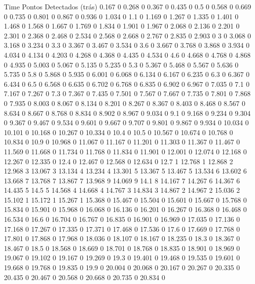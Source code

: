 Time	Pontos Detectados (trás)
0.167	0
0.268	0
0.367	0
0.435	0
0.5	0
0.568	0
0.669	0
0.735	0
0.801	0
0.867	0
0.936	0
1.034	0
1.1	0
1.169	0
1.267	0
1.335	0
1.401	0
1.468	0
1.568	0
1.667	0
1.769	0
1.834	0
1.901	0
1.967	0
2.068	0
2.136	0
2.201	0
2.301	0
2.368	0
2.468	0
2.534	0
2.568	0
2.668	0
2.767	0
2.835	0
2.903	0
3	0
3.068	0
3.168	0
3.234	0
3.3	0
3.367	0
3.467	0
3.534	0
3.6	0
3.667	0
3.768	0
3.868	0
3.934	0
4.034	0
4.134	0
4.203	0
4.268	0
4.368	0
4.435	0
4.534	0
4.6	0
4.668	0
4.768	0
4.868	0
4.935	0
5.003	0
5.067	0
5.135	0
5.235	0
5.3	0
5.367	0
5.468	0
5.567	0
5.636	0
5.735	0
5.8	0
5.868	0
5.935	0
6.001	0
6.068	0
6.134	0
6.167	0
6.235	0
6.3	0
6.367	0
6.434	0
6.5	0
6.568	0
6.635	0
6.702	0
6.768	0
6.835	0
6.902	0
6.967	0
7.035	0
7.1	0
7.167	0
7.267	0
7.3	0
7.367	0
7.435	0
7.501	0
7.567	0
7.667	0
7.735	0
7.801	0
7.868	0
7.935	0
8.003	0
8.067	0
8.134	0
8.201	0
8.267	0
8.367	0
8.403	0
8.468	0
8.567	0
8.634	0
8.667	0
8.768	0
8.834	0
8.902	0
8.967	0
9.034	0
9.1	0
9.168	0
9.234	0
9.304	0
9.367	0
9.467	0
9.534	0
9.601	0
9.667	0
9.707	0
9.801	0
9.867	0
9.934	0
10.034	0
10.101	0
10.168	0
10.267	0
10.334	0
10.4	0
10.5	0
10.567	0
10.674	0
10.768	0
10.834	0
10.9	0
10.968	0
11.067	0
11.167	0
11.201	0
11.303	0
11.367	0
11.467	0
11.569	0
11.668	0
11.734	0
11.768	0
11.834	0
11.901	0
12.001	0
12.074	0
12.168	0
12.267	0
12.335	0
12.4	0
12.467	0
12.568	0
12.634	0
12.7	1
12.768	1
12.868	2
12.968	3
13.067	3
13.134	4
13.234	4
13.301	5
13.367	5
13.467	5
13.534	6
13.602	6
13.668	7
13.768	7
13.867	7
13.968	9
14.069	9
14.1	8
14.167	7
14.267	6
14.367	6
14.435	5
14.5	5
14.568	4
14.668	4
14.767	3
14.834	3
14.867	2
14.967	2
15.036	2
15.102	1
15.172	1
15.267	1
15.368	0
15.467	0
15.504	0
15.601	0
15.667	0
15.768	0
15.834	0
15.901	0
15.968	0
16.068	0
16.136	0
16.201	0
16.267	0
16.368	0
16.468	0
16.534	0
16.6	0
16.704	0
16.767	0
16.835	0
16.901	0
16.969	0
17.035	0
17.136	0
17.168	0
17.267	0
17.335	0
17.371	0
17.468	0
17.536	0
17.6	0
17.669	0
17.768	0
17.801	0
17.868	0
17.968	0
18.036	0
18.107	0
18.167	0
18.235	0
18.3	0
18.367	0
18.467	0
18.5	0
18.568	0
18.669	0
18.701	0
18.768	0
18.835	0
18.901	0
18.969	0
19.067	0
19.102	0
19.167	0
19.269	0
19.3	0
19.401	0
19.468	0
19.535	0
19.601	0
19.668	0
19.768	0
19.835	0
19.9	0
20.004	0
20.068	0
20.167	0
20.267	0
20.335	0
20.435	0
20.467	0
20.568	0
20.668	0
20.735	0
20.834	0
